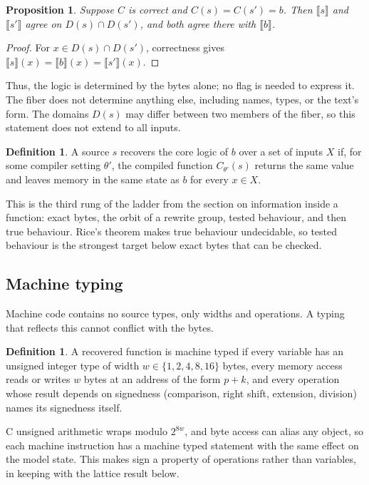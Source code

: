 \documentclass[11pt]{article}
\newtheorem{proposition}[theorem]{Proposition}
\theoremstyle{definition}
\newtheorem{definition}[theorem]{Definition}
\theoremstyle{remark}
\begin{document}
\begin{proposition}
Suppose $C$ is correct and $C(s) = C(s') = b$. Then $\llbracket s \rrbracket$ and $\llbracket s' \rrbracket$ agree on $D(s) \cap D(s')$, and both agree there with $\llbracket b \rrbracket$.
\end{proposition}

\begin{proof}
For $x \in D(s) \cap D(s')$, correctness gives $\llbracket s \rrbracket(x) = \llbracket b \rrbracket(x) = \llbracket s' \rrbracket(x)$.
\end{proof}

Thus, the logic is determined by the bytes alone; no flag is needed to express it. The fiber does not determine anything else, including names, types, or the text's form. The domains $D(s)$ may differ between two members of the fiber, so this statement does not extend to all inputs.

\begin{definition}
A source $s$ recovers the core logic of $b$ over a set of inputs $X$ if, for some compiler setting $\theta'$, the compiled function $C_{\theta'}(s)$ returns the same value and leaves memory in the same state as $b$ for every $x \in X$.
\end{definition}

This is the third rung of the ladder from the section on information inside a function: exact bytes, the orbit of a rewrite group, tested behaviour, and then true behaviour. Rice's theorem makes true behaviour undecidable, so tested behaviour is the strongest target below exact bytes that can be checked.

\subsection{Machine typing}

Machine code contains no source types, only widths and operations. A typing that reflects this cannot conflict with the bytes.

\begin{definition}
A recovered function is machine typed if every variable has an unsigned integer type of width $w \in \{1, 2, 4, 8, 16\}$ bytes, every memory access reads or writes $w$ bytes at an address of the form $p + k$, and every operation whose result depends on signedness (comparison, right shift, extension, division) names its signedness itself.
\end{definition}

C unsigned arithmetic wraps modulo $2^{8w}$, and byte access can alias any object, so each machine instruction has a machine typed statement with the same effect on the model state. This makes sign a property of operations rather than variables, in keeping with the lattice result below.
\end{document}

